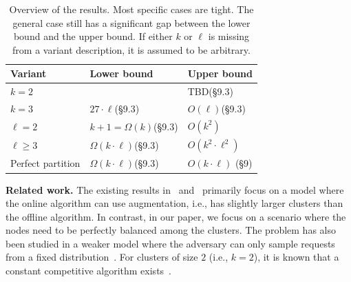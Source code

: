 \documentclass[manuscript,screen=true, review, anonymous]{acmart}
\begin{document}
\begin{table}
  \centering
  \renewcommand{\arraystretch}{1.5}
    \begin{tabular}{>{\centering\arraybackslash}p{4.5cm}|>{\centering\arraybackslash}p{4.5cm}>{\centering\arraybackslash}p{4.5cm}}
    \rowcolor{gray!50}
    \textbf{Variant} & \textbf{ Lower bound} &\textbf{Upper bound}\\ \hline 
      \textbf{$k=2$}& 3\hspace{0.3cm}\cite{repartition-disc} & TBD\hspace{0.3cm}(\S 9.3) \\ 
      \rowcolor{gray!25}
      \textbf{$k=3$}&  $27\cdot \ell $\hspace{0.3cm}(\S 9.3)& $O(\ell)$\hspace{0.3cm}(\S 9.3)\\
      \textbf{$\ell=2$}&  $k+1 = \Omega(k)$\hspace{0.3cm}(\S 9.3)&\hspace{0.3cm}$O(k^2)$\hspace{0.3cm}\cite{repartition-disc}\\
      \rowcolor{gray!25}
      $\ell \geq 3$& $\Omega(k\cdot \ell)$\hspace{0.3cm}(\S 9.3)&$O(k^2 \cdot \ell^2)$\hspace{0.3cm}\cite{repartition-disc} \\
      Perfect partition & $\Omega(k\cdot \ell)$\hspace{0.3cm}(\S 9.3)&$O(k \cdot \ell)$\hspace{0.3cm} (\S 9) \\
    \end{tabular}
                \caption{Overview of the results. Most specific cases are tight. The general case still has a significant gap between the lower bound and the upper bound. If either $k$ or $\ell$ is missing from a variant description, it is assumed to be arbitrary.
                  }
  \label{tab:overview}
  \vspace{-7mm}
\end{table}

\noindent \textbf{Related work.}
The existing results in~\cite{repartition-disc}
and~\cite{sigmetrics19_partitioning}
primarily focus on a model where 
the online algorithm can use augmentation,
i.e., has slightly larger clusters than the offline 
algorithm. In contrast, in our paper, we focus
on a scenario where the nodes need to be
perfectly balanced among the clusters.
The problem has also been studied in a weaker
model where the adversary can only sample
requests from a fixed distribution~\cite{stochastic-ring}.
For clusters of size $2$ (i.e., $k=2$), 
it is known that a constant competitive algorithm exists~\cite{repartition-disc}.
\end{document}
